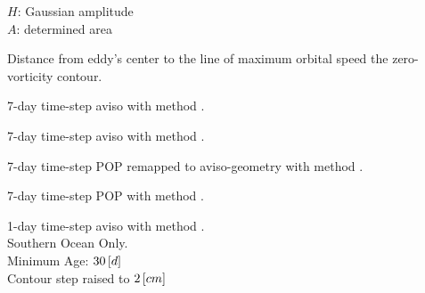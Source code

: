 \begin{fullwidth}
\begin{multicols}{2}
\begin{definition}
$H$: Gaussian amplitude\\
$A$: determined area\\
 \end{definition}
\begin{definition}\label{def:scale}
Distance from eddy's center to the line of maximum orbital speed \ie the zero-vorticity contour.
\end{definition}
\begin{definition}\label{def:aviI}
7-day time-step aviso with method \MI.
\end{definition}
\begin{definition}\label{def:aviII}
7-day time-step aviso with method \MII.
\end{definition}
\begin{definition}\label{def:p2aII}
7-day time-step POP remapped to aviso-geometry with method \MII.
\end{definition}
\begin{definition}\label{def:pop7II}
7-day time-step POP with method \MII.
\end{definition}
\begin{definition}\label{def:pop1IISO}
1-day time-step aviso with method \MII. \\Southern Ocean Only. \\Minimum Age: $30 \left[d\right]$ \\ Contour step raised to $2 \left[cm\right]$
\end{definition}
\end{multicols}
\end{fullwidth}

